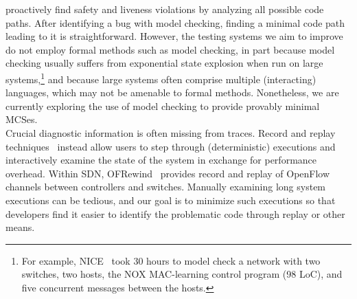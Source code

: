 proactively find safety and liveness violations by analyzing all possible code paths.
After identifying a bug with model checking, finding a minimal code path leading to it is
straightforward. However, the testing systems we aim to improve do not employ
formal methods such as model checking, in part because model checking usually suffers from exponential
state explosion when run on large systems,\footnote{For example, NICE~\cite{nice} took 30 hours to
model check a network with two switches, two hosts, the NOX MAC-learning
control program (98 LoC), and five concurrent
messages between the hosts.} and because large systems often comprise
multiple (interacting) languages, which may not be amenable to formal methods.
Nonetheless, we are currently exploring the use of model checking to provide provably
minimal MCSes.\\[0.5ex]
%
 Crucial diagnostic information is often missing from traces.
Record and replay techniques~\cite{Geels:2006:RDD:1267359.1267386,lin2013defined}
instead allow users to step through (deterministic) executions and interactively examine the
state of the system in exchange for performance overhead.
Within SDN, OFRewind~\cite{ofrewind} provides
record and replay of OpenFlow channels between controllers and switches.
Manually examining long system executions can be tedious, and our goal is to
minimize such executions so that developers find it easier to identify the
problematic code through replay or other means.\\[0.5ex]

